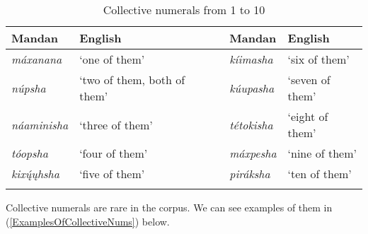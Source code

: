 \begin{table}
        \caption{Collective numerals from 1 to 10}\label{Tab1to10collective}
    \begin{tabular}{lllll}
\lsptoprule
    \textbf{Mandan}&\textbf{English}& ~&  \textbf{Mandan}&\textbf{English}\\
\midrule
    \textit{máxanana}&`one of them'&~&  \textit{kíimasha}&`six of them'\\
    \textit{núpsha}&`two of them, both of them'&~&     \textit{kúupasha}&`seven of them'\\
    \textit{náaminisha}&`three of them'&~&   \textit{tétokisha}&`eight of them'\\
    \textit{tóopsha}&`four of them'&~&   \textit{máxpesha}&`nine of them'\\
    \textit{kixų́ųhsha}&`five of them'&~&\textit{piráksha}&`ten of them'\\\lspbottomrule
    \end{tabular}

\end{table}

Collective numerals are rare in the corpus. We can see examples of them in (\ref{ExamplesOfCollectiveNums}) below.

